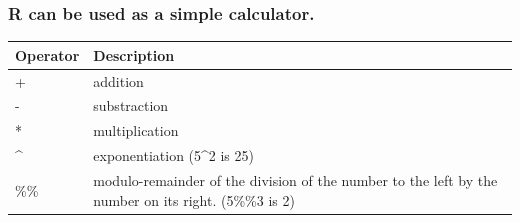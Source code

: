 \documentclass[]{article}
\begin{document}
\hypertarget{r-can-be-used-as-a-simple-calculator.}{%
\subsubsection{R can be used as a simple
calculator.}\label{r-can-be-used-as-a-simple-calculator.}}

\begin{longtable}[]{@{}ll@{}}
\toprule
\begin{minipage}[b]{0.47\columnwidth}\raggedright
Operator\strut
\end{minipage} & \begin{minipage}[b]{0.47\columnwidth}\raggedright
Description\strut
\end{minipage}\tabularnewline
\midrule
\endhead
\begin{minipage}[t]{0.47\columnwidth}\raggedright
+\strut
\end{minipage} & \begin{minipage}[t]{0.47\columnwidth}\raggedright
addition\strut
\end{minipage}\tabularnewline
\begin{minipage}[t]{0.47\columnwidth}\raggedright
-\strut
\end{minipage} & \begin{minipage}[t]{0.47\columnwidth}\raggedright
substraction\strut
\end{minipage}\tabularnewline
\begin{minipage}[t]{0.47\columnwidth}\raggedright
*\strut
\end{minipage} & \begin{minipage}[t]{0.47\columnwidth}\raggedright
multiplication\strut
\end{minipage}\tabularnewline
\begin{minipage}[t]{0.47\columnwidth}\raggedright
\^{}\strut
\end{minipage} & \begin{minipage}[t]{0.47\columnwidth}\raggedright
exponentiation (5\^{}2 is 25)\strut
\end{minipage}\tabularnewline
\begin{minipage}[t]{0.47\columnwidth}\raggedright
\%\%\strut
\end{minipage} & \begin{minipage}[t]{0.47\columnwidth}\raggedright
modulo-remainder of the division of the number to the left by the number
on its right. (5\%\%3 is 2)\strut
\end{minipage}\tabularnewline
\bottomrule
\end{longtable}
\end{document}
